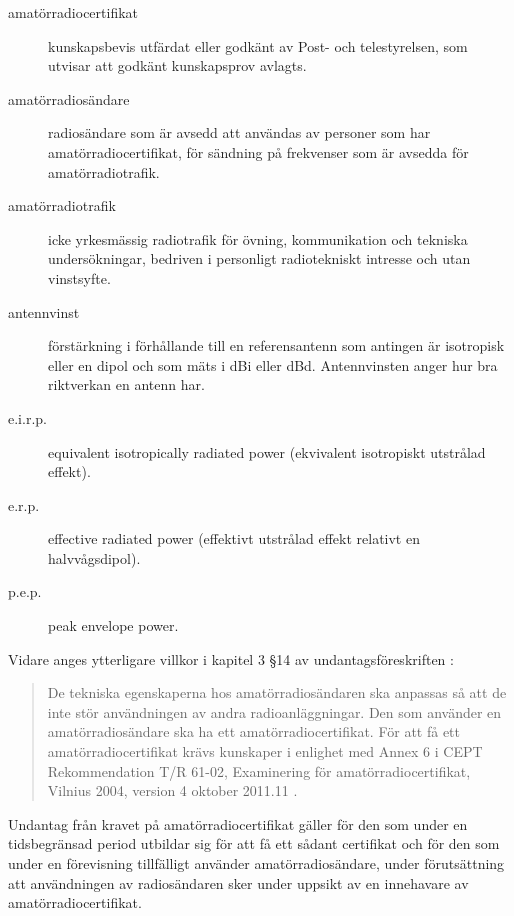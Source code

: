 \newpage %
\begin{description}
\item[amatörradiocertifikat] kunskapsbevis utfärdat eller godkänt av
Post- och telestyrelsen, som utvisar att godkänt kunskapsprov avlagts.

\item[amatörradiosändare] radiosändare som är avsedd att användas av personer
som har amatörradiocertifikat, för sändning på frekvenser som är avsedda för
amatörradiotrafik.

\item[amatörradiotrafik] icke yrkesmässig radiotrafik för övning,
kommunikation och tekniska undersökningar, bedriven i personligt radiotekniskt
intresse och utan vinstsyfte.

\item[antennvinst] förstärkning i förhållande till en referensantenn som
antingen är isotropisk eller en dipol och som mäts i dBi eller dBd.
Antennvinsten anger hur bra riktverkan en antenn har.

\item[e.i.r.p.] equivalent isotropically radiated power (ekvivalent
isotropiskt utstrålad effekt).

\item[e.r.p.] effective radiated power (effektivt utstrålad effekt relativt en
halvvågsdipol).

\item[p.e.p.] peak envelope power.
\end{description}
Vidare anges ytterligare villkor i kapitel 3 \S 14 av undantagsföreskriften
\cite{PTSFS2018:3}:
\begin{quote}
De tekniska egenskaperna hos amatörradiosändaren ska anpassas så att de inte
stör användningen av andra radioanläggningar.
Den som använder en amatörradiosändare ska ha ett amatörradiocertifikat.
För att få ett amatörradiocertifikat krävs kunskaper i enlighet med Annex 6 i
CEPT Rekommendation T/R 61-02, Examinering för amatörradiocertifikat,
Vilnius 2004, version 4 oktober 2011.11 \cite{TR6102}.
\end{quote}
Undantag från kravet på amatörradiocertifikat gäller för den som under en
tidsbegränsad period utbildar sig för att få ett sådant certifikat och för den
som under en förevisning tillfälligt använder amatörradiosändare, under
förutsättning att användningen av radiosändaren sker under uppsikt av en
innehavare av amatörradiocertifikat.

